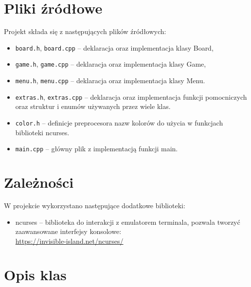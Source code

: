 \documentclass{article}
\begin{document}
\section{Pliki źródłowe}

Projekt składa się z następujących plików źródłowych:
    \begin{itemize}
    \item \texttt{board.h}, \texttt{board.cpp} – deklaracja oraz implementacja klasy Board,
    \item \texttt{game.h}, \texttt{game.cpp} – deklaracja oraz implementacja klasy Game,
    \item \texttt{menu.h}, \texttt{menu.cpp} – deklaracja oraz implementacja klasy Menu.
    \item \texttt{extras.h}, \texttt{extras.cpp} – deklaracja oraz implementacja funkcji pomocniczych oraz struktur 
    i enumów używanych przez wiele klas.
    \item \texttt{color.h} – definicje preprocesora nazw kolorów do użycia w funkcjach biblioteki ncurses.
    \item \texttt{main.cpp} – główny plik z implementacją funkcji main.
    \end{itemize}

\section{Zależności}

W projekcie wykorzystano następujące dodatkowe biblioteki:
    \begin{itemize}
    \item ncurses – biblioteka do interakcji z emulatorem terminala,  
    pozwala tworzyć zaawansowane interfejsy konsolowe:\\
    \url{https://invisible-island.net/ncurses/}
    \end{itemize}
\section{Opis klas}
\end{document}
